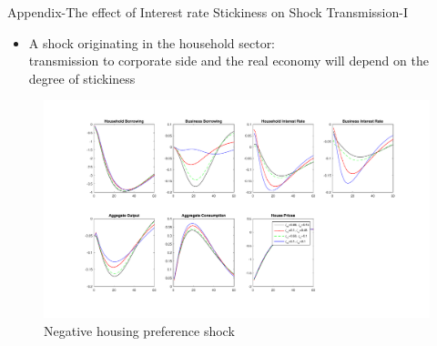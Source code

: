 \documentclass[8pt,aspectratio=169]{beamer}
\numberwithin{equation}{section}
\begin{document}
\begin{frame}{Appendix-The effect of Interest rate Stickiness on Shock Transmission-I}

\begin{itemize}
\item A shock originating in the household sector:\\
transmission to corporate side and the real economy will depend on the degree of stickiness
\end{itemize}    

\begin{figure}[H]
\centering
\caption{Negative housing preference shock}
\includegraphics[scale=0.3]{stickinessJ.pdf}
\end{figure}



\end{frame}
\end{document}
